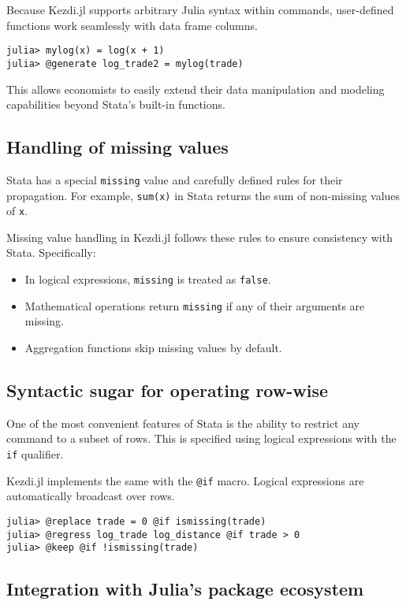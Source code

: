 \documentclass{juliacon}
\begin{document}
Because Kezdi.jl supports arbitrary Julia syntax within commands, user-defined functions work seamlessly with data frame columns.

\begin{verbatim}
julia> mylog(x) = log(x + 1)
julia> @generate log_trade2 = mylog(trade)
\end{verbatim}

This allows economists to easily extend their data manipulation and modeling capabilities beyond Stata's built-in functions. 

\subsection{Handling of missing values}

Stata has a special \texttt{missing} value and carefully defined rules for their propagation. For example, \texttt{sum(x)} in Stata returns the sum of non-missing values of \texttt{x}.

Missing value handling in Kezdi.jl follows these rules to ensure consistency with Stata. Specifically:
\begin{itemize}
    \item In logical expressions, \texttt{missing} is treated as \texttt{false}.
    \item Mathematical operations return \texttt{missing} if any of their arguments are missing.
    \item Aggregation functions skip missing values by default.
\end{itemize}

\subsection{Syntactic sugar for operating row-wise}

One of the most convenient features of Stata is the ability to restrict any command to a subset of rows. This is specified using logical expressions with the \texttt{if} qualifier.

Kezdi.jl implements the same with the \texttt{@if} macro. Logical expressions are automatically broadcast over rows.

\begin{verbatim}
julia> @replace trade = 0 @if ismissing(trade)
julia> @regress log_trade log_distance @if trade > 0
julia> @keep @if !ismissing(trade) 
\end{verbatim}

\subsection{Integration with Julia's package ecosystem}
\end{document}

